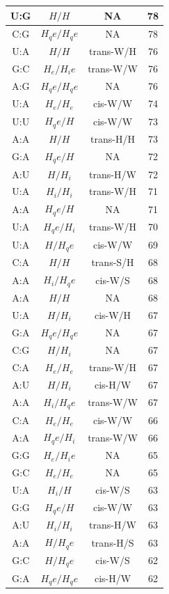 \begin{center}
\begin{longtable}{c|c|c|c}
U:G & $H/H$ & NA & 78 \\  \hline
C:G & $H_qe/H_qe$ & NA & 78 \\  \hline
U:A & $H/H$ & trans-W/H & 76 \\  \hline
G:C & $H_e/H_ie$ & trans-W/W & 76 \\  \hline
A:G & $H_qe/H_qe$ & NA & 76 \\  \hline
U:A & $H_e/H_e$ & cis-W/W & 74 \\  \hline
U:U & $H_qe/H$ & cis-W/W & 73 \\  \hline
A:A & $H/H$ & trans-H/H & 73 \\  \hline
G:A & $H_qe/H$ & NA & 72 \\  \hline
A:U & $H/H_i$ & trans-H/W & 72 \\  \hline
U:A & $H_i/H_i$ & trans-W/H & 71 \\  \hline
A:A & $H_qe/H$ & NA & 71 \\  \hline
U:A & $H_qe/H_i$ & trans-W/H & 70 \\  \hline
U:A & $H/H_qe$ & cis-W/W & 69 \\  \hline
C:A & $H/H$ & trans-S/H & 68 \\  \hline
A:A & $H_i/H_qe$ & cis-W/S & 68 \\  \hline
A:A & $H/H$ & NA & 68 \\  \hline
U:A & $H/H_i$ & cis-W/H & 67 \\  \hline
G:A & $H_qe/H_qe$ & NA & 67 \\  \hline
C:G & $H/H_i$ & NA & 67 \\  \hline
C:A & $H_e/H_e$ & trans-W/H & 67 \\  \hline
A:U & $H/H_i$ & cis-H/W & 67 \\  \hline
A:A & $H_i/H_qe$ & trans-W/W & 67 \\  \hline
C:A & $H_e/H_e$ & cis-W/W & 66 \\  \hline
A:A & $H_qe/H_i$ & trans-W/W & 66 \\  \hline
G:G & $H_e/H_ie$ & NA & 65 \\  \hline
G:C & $H_e/H_e$ & NA & 65 \\  \hline
U:A & $H_i/H$ & cis-W/S & 63 \\  \hline
G:G & $H_qe/H$ & cis-W/W & 63 \\  \hline
A:U & $H_i/H_i$ & trans-H/W & 63 \\  \hline
A:A & $H/H_qe$ & trans-H/S & 63 \\  \hline
G:C & $H/H_qe$ & cis-W/S & 62 \\  \hline
G:A & $H_qe/H_qe$ & cis-H/W & 62 \\  \hline

\end{longtable}
\end{center}
